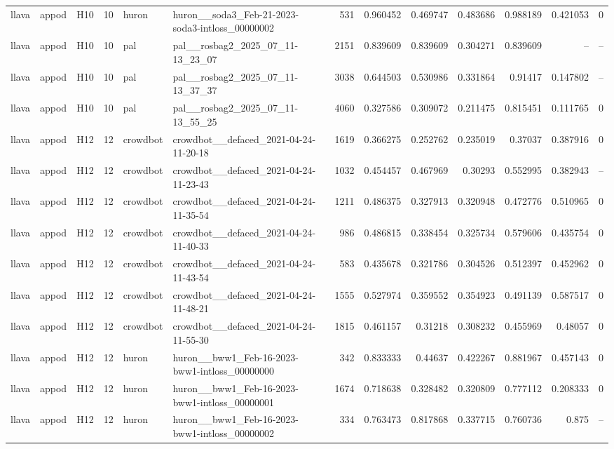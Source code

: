 \begin{longtable}{lllrllrrrrrrr}
llava & appod & H10 & 10 & huron & huron\_\_soda3\_Feb-21-2023-soda3-intloss\_00000002 & 531 & 0.960452 & 0.469747 & 0.483686 & 0.988189 & 0.421053 & 0 \\
llava & appod & H10 & 10 & pal & pal\_\_rosbag2\_2025\_07\_11-13\_23\_07 & 2151 & 0.839609 & 0.839609 & 0.304271 & 0.839609 & -- & -- \\
llava & appod & H10 & 10 & pal & pal\_\_rosbag2\_2025\_07\_11-13\_37\_37 & 3038 & 0.644503 & 0.530986 & 0.331864 & 0.91417 & 0.147802 & -- \\
llava & appod & H10 & 10 & pal & pal\_\_rosbag2\_2025\_07\_11-13\_55\_25 & 4060 & 0.327586 & 0.309072 & 0.211475 & 0.815451 & 0.111765 & 0 \\
llava & appod & H12 & 12 & crowdbot & crowdbot\_\_defaced\_2021-04-24-11-20-18 & 1619 & 0.366275 & 0.252762 & 0.235019 & 0.37037 & 0.387916 & 0 \\
llava & appod & H12 & 12 & crowdbot & crowdbot\_\_defaced\_2021-04-24-11-23-43 & 1032 & 0.454457 & 0.467969 & 0.30293 & 0.552995 & 0.382943 & -- \\
llava & appod & H12 & 12 & crowdbot & crowdbot\_\_defaced\_2021-04-24-11-35-54 & 1211 & 0.486375 & 0.327913 & 0.320948 & 0.472776 & 0.510965 & 0 \\
llava & appod & H12 & 12 & crowdbot & crowdbot\_\_defaced\_2021-04-24-11-40-33 & 986 & 0.486815 & 0.338454 & 0.325734 & 0.579606 & 0.435754 & 0 \\
llava & appod & H12 & 12 & crowdbot & crowdbot\_\_defaced\_2021-04-24-11-43-54 & 583 & 0.435678 & 0.321786 & 0.304526 & 0.512397 & 0.452962 & 0 \\
llava & appod & H12 & 12 & crowdbot & crowdbot\_\_defaced\_2021-04-24-11-48-21 & 1555 & 0.527974 & 0.359552 & 0.354923 & 0.491139 & 0.587517 & 0 \\
llava & appod & H12 & 12 & crowdbot & crowdbot\_\_defaced\_2021-04-24-11-55-30 & 1815 & 0.461157 & 0.31218 & 0.308232 & 0.455969 & 0.48057 & 0 \\
llava & appod & H12 & 12 & huron & huron\_\_bww1\_Feb-16-2023-bww1-intloss\_00000000 & 342 & 0.833333 & 0.44637 & 0.422267 & 0.881967 & 0.457143 & 0 \\
llava & appod & H12 & 12 & huron & huron\_\_bww1\_Feb-16-2023-bww1-intloss\_00000001 & 1674 & 0.718638 & 0.328482 & 0.320809 & 0.777112 & 0.208333 & 0 \\
llava & appod & H12 & 12 & huron & huron\_\_bww1\_Feb-16-2023-bww1-intloss\_00000002 & 334 & 0.763473 & 0.817868 & 0.337715 & 0.760736 & 0.875 & -- \\

\end{longtable}
